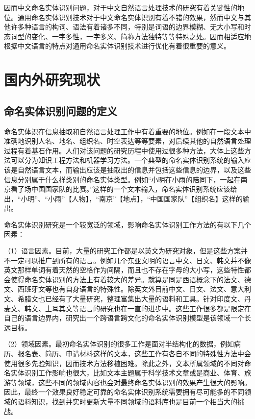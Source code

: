 \documentclass[winfonts,master,oneside,nobackinfo]{njuthesis}
\begin{document}
因而中文命名实体识别问题，对于中文自然语言处理技术的研究有着关键性的地位。通用命名实体识别技术对于中文命名实体识别有着不错的效果，然而中文与其他许多种语言的构词、语法有着诸多不同，特别是词语的边界模糊、无大小写和时态词型的变化、一字多性，一字多义、简称方法独特等等特殊之处。因而相适应地根据中文语言的特点对通用命名实体识别技术进行优化有着很重要的意义。



\section{国内外研究现状}
\subsection{命名实体识别问题的定义}
命名实体识在信息抽取和自然语言处理工作中有着重要的地位。例如在一段文本中准确地识别人名、地名、组织名、时空表达等等要素，对后续其他的自然语言处理过程有着基石作用。人们对该问题的研究历程中使用过很多种方法，大体上这些方法可以分为知识工程方法和机器学习方法。一个典型的命名实体识别系统的输入应该是自然语言文本，而输出应该是抽取出的信息并包括这些信息的边界，以及这些信息分别属于什么样类别的命名实体类型。例如“小明在小雨的陪同下，一起在南京看了场中国国家队的比赛。”这样的一个文本输入，命名实体识别系统应该给出，“小明”、“小雨”【人物】，“南京”【地点】，“中国国家队”【组织名】这样的输出。

命名实体识别研究是一个较宽泛的领域，影响命名实体识别工作方法的有以下几个因素\cite{ASTUDY}：

（1）语言因素。目前，大量的研究工作都是以英文为研究对象，但是这些方案并不一定可以推广到所有的语言。例如几个东亚文明的语言中文、日文、韩文并不像英文那样单词有着天然的空格作为间隔，而且也不存在字母的大小写，这些特性都会使得命名实体识别的方法上有着较大的差异。就算是同是西语概念下的法文、德文、西班牙文等也有自身语言的特殊性。除英文外目前中文、日文、法文、意大利文、希腊文也已经有了大量研究，整理富集出大量的语料和工具。针对印度文、丹麦文、韩文、土耳其文等语言的研究也在一直的进步中。这些工作很多都是限定在自己的语言边界内，研究出一个跨语言跨文化的命名实体识别模型是该领域一个长远目标。

（2）领域因素。最初命名实体识别的很多工作是面对半结构化的数据，例如病历、报名表、简历、申请材料这样的文本，这些工作有各自不同的特殊性方法中会使用很多先验知识，因而技术方法移植困难。除此之外，文本所属领域的不同对命名实体识别工作影响也很大，比如文本主题属于科学技术文章或是商业、体育、旅游等领域，这些不同的领域内容也会对最终命名实体识别的效果产生很大的影响。因此，最终一个效果良好稳定可靠的命名实体识别系统需要拥有尽可能多的不同领域的语料知识，找到并实时更新大量不同领域的语料库也是目前一个相当大的挑战。
\end{document}
